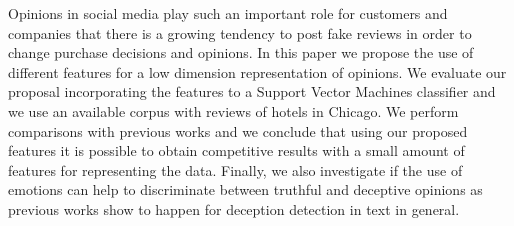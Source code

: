 Opinions in social media play such an important role for customers and companies that there is a growing tendency to post fake reviews in order to change purchase decisions and opinions. In this paper we propose the use of different features for a low dimension representation of opinions. We evaluate our proposal incorporating the features to a Support Vector Machines classifier and we use an available corpus with reviews of hotels in Chicago. We perform comparisons with previous works and we conclude that using our proposed features it is possible to obtain competitive results with a small amount of features for representing the data. Finally, we also investigate if the use of emotions can help to discriminate between truthful and deceptive opinions as previous works show to happen for deception detection in text in general.
